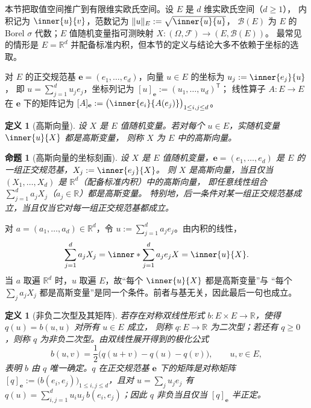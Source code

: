 \documentclass[UTF8,11pt,a4paper,oneside,fontset=fandol]{ctexrep}
\makeatletter
\numberwithin{equation}{section}
\theoremstyle{zhthm}
\newtheorem{proposition}[theorem]{命题}
\newtheorem{definition}[theorem]{定义}
\renewenvironment{proof}[1][\proofname]{\par
  \pushQED{\qed}%
  \normalfont\topsep6\p@\@plus6\p@\relax
  \trivlist
  \item[\hskip\labelsep\bfseries#1\hspace{0.5em}]\ignorespaces
}{%
  \popQED\endtrivlist\@endpefalse
}
\renewcommand{\proofname}{证明}
\newcommand{\R}{\mathbb{R}}
\newcommand{\B}{\mathcal{B}}
\newcommand{\F}{\mathcal{F}}
\DeclarePairedDelimiter{\norm}{\lVert}{\rVert}
\makeatother
\begin{document}
本节把取值空间推广到有限维实欧氏空间。设 $E$ 是 $d$ 维实欧氏空间（$d\ge1$），
内积记为 $\inner{u}{v}$，范数记为 $\norm{u}_E:=\sqrt{\inner{u}{u}}$，
$\B(E)$ 为 $E$ 的 Borel $\sigma$ 代数；$E$ 值随机变量指可测映射 $X:(\Omega,\F)\to(E,\B(E))$。
最常见的情形是 $E=\R^d$ 并配备标准内积，但本节的定义与结论大多不依赖于坐标的选取。

对 $E$ 的正交规范基 $\mathbf e=(e_1,\ldots,e_d)$，向量 $u\in E$ 的坐标为 $u_j:=\inner{e_j}{u}$，
即 $u=\sum_{j=1}^{d}u_je_j$，坐标列记为 $[u]_{\mathbf e}:=(u_1,\ldots,u_d)^{\mathsf T}$；
线性算子 $A:E\to E$ 在 $\mathbf e$ 下的矩阵记为
$[A]_{\mathbf e}:=\bigl(\inner{e_i}{A(e_j)}\bigr)_{1\le i,j\le d}$。

\begin{definition}[高斯向量]
\label{def:gaussian-vector}
设 $X$ 是 $E$ 值随机变量。若对每个 $u\in E$，实随机变量 $\inner{u}{X}$ 都是高斯变量，
则称 $X$ 为 $E$ 中的高斯向量。
\end{definition}

\begin{proposition}[高斯向量的坐标刻画]
\label{prop:gaussian-vector-coordinates}
设 $X$ 是 $E$ 值随机变量，$\mathbf e=(e_1,\ldots,e_d)$ 是 $E$ 的一组正交规范基，$X_j:=\inner{e_j}{X}$。
则 $X$ 是高斯向量，当且仅当 $(X_1,\ldots,X_d)$ 是 $\R^d$（配备标准内积）中的高斯向量，
即任意线性组合 $\sum_{j=1}^{d}a_jX_j$（$a_j\in\R$）都是高斯变量。
特别地，后一条件对某一组正交规范基成立，当且仅当它对每一组正交规范基都成立。
\end{proposition}

\begin{proof}
对 $a=(a_1,\ldots,a_d)\in\R^d$，令 $u:=\sum_{j=1}^{d}a_je_j$。由内积的线性，
\[
  \sum_{j=1}^{d}a_jX_j=\inner*{\sum_{j=1}^{d}a_je_j}{X}=\inner{u}{X}.
\]
当 $a$ 取遍 $\R^d$ 时，$u$ 取遍 $E$，故“每个 $\inner{u}{X}$ 都是高斯变量”与
“每个 $\sum_ja_jX_j$ 都是高斯变量”是同一个条件。前者与基无关，因此最后一句也成立。
\end{proof}

\begin{definition}[非负二次型及其矩阵]
\label{def:nonnegative-quadratic-form}
若存在对称双线性形式 $b:E\times E\to\R$，使得 $q(u)=b(u,u)$ 对所有 $u\in E$ 成立，
则称 $q:E\to\R$ 为二次型；若还有 $q\ge0$，则称 $q$ 为非负二次型。由双线性展开得到的极化公式
\begin{equation}
  \label{eq:polarization}
  b(u,v)=\frac12\bigl(q(u+v)-q(u)-q(v)\bigr),\qquad u,v\in E,
\end{equation}
表明 $b$ 由 $q$ 唯一确定。$q$ 在正交规范基 $\mathbf e$ 下的矩阵是对称矩阵
$[q]_{\mathbf e}:=\bigl(b(e_i,e_j)\bigr)_{1\le i,j\le d}$，且对 $u=\sum_ju_je_j$ 有
$q(u)=\sum_{i,j=1}^{d}u_iu_j\,b(e_i,e_j)$；因此 $q$ 非负当且仅当 $[q]_{\mathbf e}$ 半正定。
\end{definition}
\end{document}
